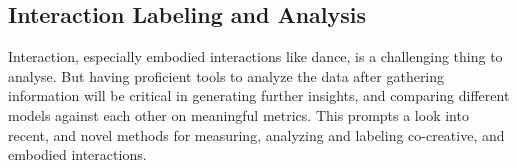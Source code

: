 \documentclass[final,5p,times,twocolumn,authoryear]{article}
\begin{document}

\subsection{Interaction Labeling and Analysis}
Interaction, especially embodied interactions like dance, is a
challenging thing to analyse. But having proficient tools to analyze the
data after gathering information will be critical in generating further
insights, and comparing different models against each other on
meaningful metrics. This prompts a look into recent, and novel methods
for measuring, analyzing and labeling co-creative, and embodied interactions.




\end{document}
